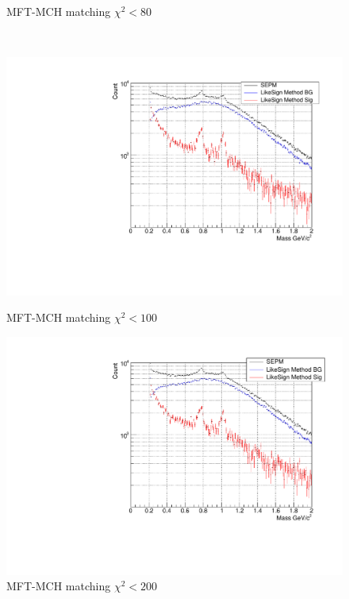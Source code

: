 \begin{figure}[htbp]
\begin{minipage}{0.45\textwidth}
                    \captionsetup{labelformat=empty}
                    \caption{MFT-MCH matching $\chi^2 < 80$} 
                    \label{fig:chi2_80}
                \end{minipage}
                \\
                \vspace{1em}
                \begin{minipage}{0.45\textwidth}
                    \centering
                    \includegraphics[width=\textwidth]{fig/3_4_4_chi2_100.pdf}
                    \captionsetup{labelformat=empty}
                    \caption{MFT-MCH matching $\chi^2 < 100$}
                    \label{fig:chi2_100}
                \end{minipage}
                \hfill
                \begin{minipage}{0.45\textwidth}
                    \centering
                    \includegraphics[width=\textwidth]{fig/3_4_4_chi2_200.pdf}
                    \captionsetup{labelformat=empty}
                    \caption{MFT-MCH matching $\chi^2 < 200$}
                    \label{fig:chi2_200}
                \end{minipage}
            \end{figure}

